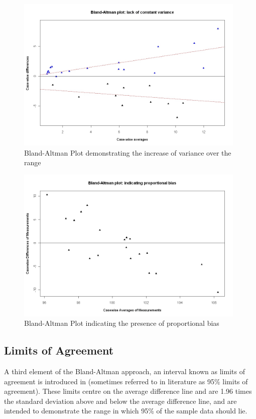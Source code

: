 \documentclass[12pt, a4paper]{report}
\theoremstyle{plain}
\theoremstyle{definition}
\theoremstyle{remark}
\begin{document}
	\begin{figure}[h!]
		\begin{center}
			\includegraphics[width=110mm]{images/BAFanEffect.jpeg}
			\caption{Bland-Altman Plot demonstrating the increase of variance over the range}\label{BAFanEffect}
		\end{center}
	\end{figure}
	
\begin{figure}[h!]
\begin{center}
\includegraphics[width=110mm]{images/PropBias.jpeg}
\caption{Bland-Altman Plot indicating the presence of proportional bias}\label{PropBias}
\end{center}
\end{figure}

\subsection{Limits of Agreement}
A third element of the Bland-Altman approach, an interval known
as limits of agreement is introduced in \citet*{BA86} (sometimes referred to in literature as 95\% limits of agreement). These limits centre on the
average difference line and are 1.96 times the standard deviation
above and below the average difference line, and are intended to demonstrate the range in which 95\% of the sample data should lie.
\end{document}
